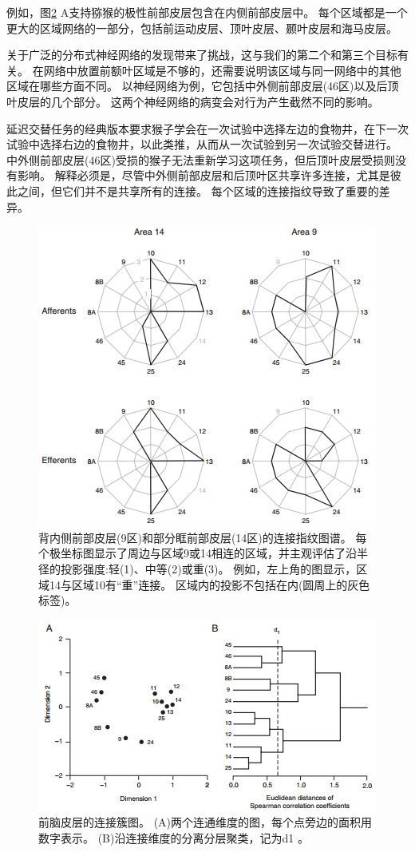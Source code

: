 \par
例如，图\ref{fig:1_7} A支持猕猴的极性前部皮层包含在内侧前部皮层中。
每个区域都是一个更大的区域网络的一部分，包括前运动皮层、顶叶皮层、颞叶皮层和海马皮层。

\par
关于广泛的分布式神经网络的发现带来了挑战，这与我们的第二个和第三个目标有关。
在网络中放置前额叶区域是不够的，还需要说明该区域与同一网络中的其他区域在哪些方面不同。
以神经网络为例，它包括中外侧前部皮层(46区)以及后顶叶皮层的几个部分。
这两个神经网络的病变会对行为产生截然不同的影响。

\par
延迟交替任务的经典版本要求猴子学会在一次试验中选择左边的食物井，在下一次试验中选择右边的食物井，以此类推，从而从一次试验到另一次试验交替进行。
中外侧前部皮层(46区)受损的猴子无法重新学习这项任务\cite{butters1969retention}，但后顶叶皮层受损则没有影响\cite{ettlinger1966tactile}。
解释必须是，尽管中外侧前部皮层和后顶叶区共享许多连接，尤其是彼此之间，但它们并不是共享所有的连接。
每个区域的连接指纹导致了重要的差异。


\begin{figure}[!htb]
	\centering
	\includegraphics[width=0.5\linewidth]{image_pfc/Fig_1_6}
	\caption{背内侧前部皮层(9区)和部分眶前部皮层(14区)的连接指纹图谱。
		每个极坐标图显示了周边与区域9或14相连的区域，并主观评估了沿半径的投影强度:轻(1)、中等(2)或重(3)。
		例如，左上角的图显示，区域14与区域10有“重”连接。
		区域内的投影不包括在内(圆周上的灰色标签)\cite{2002Dorsal}。 \label{fig:1_6}}
\end{figure}

\begin{figure}[!htb]
	\centering
	\includegraphics[width=0.5\linewidth]{image_pfc/Fig_1_7}
	\caption{前脑皮层的连接簇图。
		(A)两个连通维度的图，每个点旁边的面积用数字表示。
		(B)沿连接维度的分离分层聚类，记为d1 \cite{2002Dorsal}。\label{fig:1_7}}
\end{figure}


